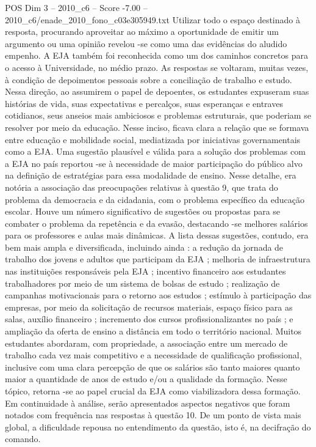 \begin{textsample}{POS Dim 3 – 2010\_c6 – Score -7.00 – 2010\_c6/enade\_2010\_fono\_c03e305949.txt}
Utilizar todo o espaço destinado à resposta, procurando aproveitar ao máximo a oportunidade de emitir um argumento ou uma opinião revelou -se como uma das evidências do aludido empenho.
A EJA também foi reconhecida como um dos caminhos concretos para o acesso à Universidade, no médio prazo.
As respostas se voltaram, muitas vezes, à condição de depoimentos pessoais sobre a conciliação de trabalho e estudo.
Nessa direção, ao assumirem o papel de depoentes, os estudantes expuseram suas histórias de vida, suas expectativas e percalços, suas esperanças e entraves cotidianos, seus anseios mais ambiciosos e problemas estruturais, que poderiam se resolver por meio da educação.
Nesse inciso, ficava clara a relação que se formava entre educação e mobilidade social, mediatizada por iniciativas governamentais como a EJA.
Uma sugestão plausível e válida para a solução dos problemas com a EJA no país reportou -se à necessidade de maior participação do público alvo na definição de estratégias para essa modalidade de ensino.
Nesse detalhe, era notória a associação das preocupações relativas à questão 9, que trata do problema da democracia e da cidadania, com o problema específico da educação escolar.
Houve um número significativo de sugestões ou propostas para se combater o problema da repetência e da evasão, destacando -se melhores salários para os professores e aulas mais dinâmicas.
A lista dessas sugestões, contudo, era bem mais ampla e diversificada, incluindo ainda : a redução da jornada de trabalho dos jovens e adultos que participam da EJA ; melhoria de infraestrutura nas instituições responsáveis pela EJA ; incentivo financeiro aos estudantes trabalhadores por meio de um sistema de bolsas de estudo ; realização de campanhas motivacionais para o retorno aos estudos ; estímulo à participação das empresas, por meio da solicitação de recursos materiais, espaço físico para as salas, auxílio financeiro ; incremento dos cursos profissionalizantes no país ; e ampliação da oferta de ensino a distância em todo o território nacional.
Muitos estudantes abordaram, com propriedade, a associação entre um mercado de trabalho cada vez mais competitivo e a necessidade de qualificação profissional, inclusive com uma clara percepção de que os salários são tanto maiores quanto maior a quantidade de anos de estudo e/ou a qualidade da formação.
Nesse tópico, retorna -se ao papel crucial da EJA como viabilizadora dessa formação.
Em continuidade à análise, serão apresentados aspectos negativos que foram notados com frequência nas respostas à questão 10.
De um ponto de vista mais global, a dificuldade repousa no entendimento da questão, isto é, na decifração do comando.

\end{textsample}
